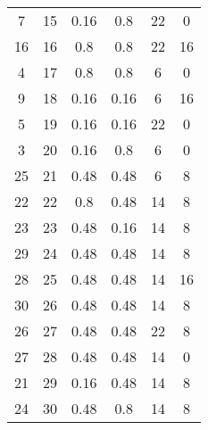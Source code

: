\begin{longtable}{@{\extracolsep{\fill}}cccccc@{}}
    7   & 15  & 0.16            & 0.8            & 22       & 0        \\
    16  & 16  & 0.8             & 0.8            & 22       & 16       \\
    4   & 17  & 0.8             & 0.8            & 6        & 0        \\
    9   & 18  & 0.16            & 0.16           & 6        & 16       \\
    5   & 19  & 0.16            & 0.16           & 22       & 0        \\
    3   & 20  & 0.16            & 0.8            & 6        & 0        \\
    25  & 21  & 0.48            & 0.48           & 6        & 8        \\
    22  & 22  & 0.8             & 0.48           & 14       & 8        \\
    23  & 23  & 0.48            & 0.16           & 14       & 8        \\
    29  & 24  & 0.48            & 0.48           & 14       & 8        \\
    28  & 25  & 0.48            & 0.48           & 14       & 16       \\
    30  & 26  & 0.48            & 0.48           & 14       & 8        \\
    26  & 27  & 0.48            & 0.48           & 22       & 8        \\
    27  & 28  & 0.48            & 0.48           & 14       & 0        \\
    21  & 29  & 0.16            & 0.48           & 14       & 8        \\
    24  & 30  & 0.48            & 0.8            & 14       & 8        \\ \bottomrule
\end{longtable}
